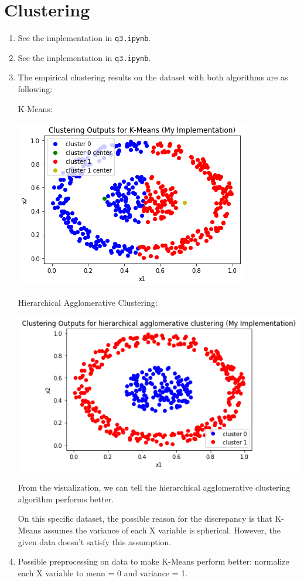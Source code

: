 \documentclass[paper=letter, fontsize=12pt]{article}
\begin{document}
\section{Clustering}
\begin{enumerate}[label=(\alph*)]
	\item See the implementation in \verb|q3.ipynb|.
	
	\item See the implementation in \verb|q3.ipynb|.
	
	\item The empirical clustering results on the dataset with both algorithms are as following:
	
	K-Means:
	
	\includegraphics[scale=0.6]{q3c1.png}
	
	Hierarchical Agglomerative Clustering:
	
	\includegraphics[scale=0.6]{q3c2.png}
	
	From the visualization, we can tell the hierarchical agglomerative clustering algorithm performs better. 
	
	On this specific dataset, the possible reason for the discrepancy is that K-Means assumes the variance of each X variable is spherical. However, the given data doesn't satisfy this assumption. 
	
	\item Possible preprocessing on data to make K-Means perform better: normalize each X variable to mean = 0 and variance = 1.
\end{enumerate}
\end{document}
